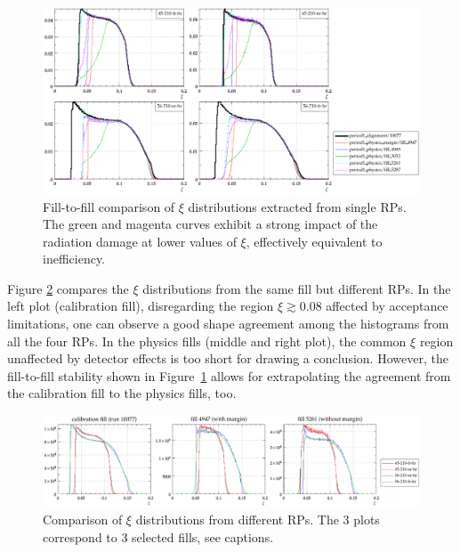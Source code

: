 \documentclass[TOTEM]{cern/cernphprep}
\begin{document}
\begin{figure}[h!]
\begin{center}
\includegraphics[width=\hsize]{fig/validation/xi_cmp_run.pdf}
\caption{%
Fill-to-fill comparison of $\xi$ distributions extracted from single RPs. The green and magenta curves exhibit a strong impact of the radiation damage at lower values of $\xi$, effectively equivalent to inefficiency.
}
\label{fig:xi_cmp_run}
\end{center}
\end{figure}


Figure \ref{fig:xi_cmp_rp} compares the $\xi$ distributions from the same fill but different RPs. In the left plot (calibration fill), disregarding the region $\xi\gtrsim 0.08$ affected by acceptance limitations, one can observe a good shape agreement among the histograms from all the four RPs. In the physics fills (middle and right plot), the common $\xi$ region unaffected by detector effects is too short for drawing a conclusion. However, the fill-to-fill stability shown in Figure~\ref{fig:xi_cmp_run} allows for extrapolating the agreement from the calibration fill to the physics fills, too.

\begin{figure}[h!]
\begin{center}
\includegraphics[width=\hsize]{fig/validation/xi_cmp_rp.pdf}
\caption{%
Comparison of $\xi$ distributions from different RPs. The 3 plots correspond to 3 selected fills, see captions.
}
\label{fig:xi_cmp_rp}
\end{center}
\end{figure}
\end{document}
